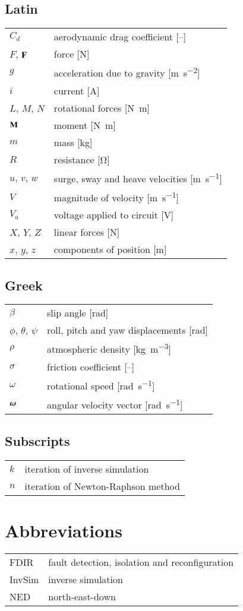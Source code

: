 \subsection*{Latin}
\begin{tabular}{@{}l l}
	$ C_d $	& aerodynamic drag coefficient [--] \\
	$ F $, $ \boldsymbol{\mathbf{F}} $	& force [\si{\newton}] \\
	$ g $	& acceleration due to gravity [\si{\metre\per\square\second}] \\
	$ i $	& current [\si{\ampere}] \\
	$ L $, $ M $, $ N $ & rotational forces [\si{\newton\metre}] \\
	$ \boldsymbol{\mathbf{M}} $	& moment [\si{\newton\metre}] \\
	$ m $	& mass [\si{\kilogram}] \\
	$ R $	& resistance [\si{\ohm}] \\
	$ u $, $ v $, $ w $	& surge, sway and heave velocities [\si{\metre\per\second}] \\
	$ V $	& magnitude of velocity [\si{\metre\per\second}] \\
	$ V_a $	& voltage applied to circuit [\si{\volt}] \\
	$ X $, $ Y $, $ Z $	& linear forces [\si{\newton}] \\
	$x$, $y$, $z$ 		& components of position [\si{\metre}] \\
\end{tabular}

\subsection*{Greek}
\begin{tabular}{@{}l l}
	$ \beta $	& slip angle [\si{\radian}] \\
	$\phi$, $\theta$, $\psi$	& roll, pitch and yaw displacements [\si{\radian}] \\
	$ \rho $	& atmospheric density [\si{\kilogram\per\cubic\metre}] \\
	$ \sigma $	& friction coefficient [--] \\
	$ \omega $	& rotational speed [\si{\radian\per\second}] \\
	$ \boldsymbol{\mathbf{\omega}} $	& angular velocity vector [\si{\radian\per\second}]
\end{tabular}

\subsection*{Subscripts}
\begin{tabular}{@{}l l}
	$ k $	& iteration of inverse simulation \\
	$ n $	& iteration of Newton-Raphson method \\
\end{tabular}

\section*{Abbreviations}
\begin{tabular}{@{}l l}
FDIR	& fault detection, isolation and reconfiguration \\
InvSim	& inverse simulation \\
NED		& north-east-down \\
\end{tabular}


